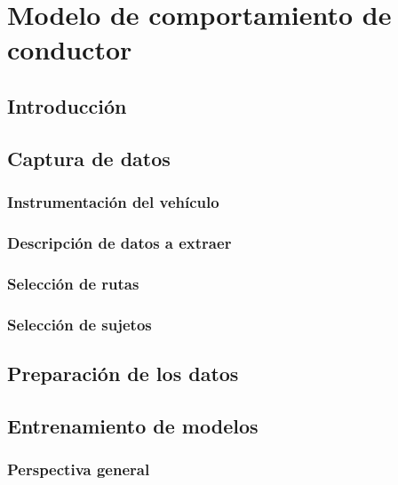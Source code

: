 \chapter{Modelo de comportamiento de conductor}
\label{ch:behavior-model}

\section{Introducción}


\section{Captura de datos}

\subsection{Instrumentación del vehículo}

\subsection{Descripción de datos a extraer}

\subsection{Selección de rutas}

\subsection{Selección de sujetos}

\section{Preparación de los datos}

\section{Entrenamiento de modelos}

\subsection{Perspectiva general}


